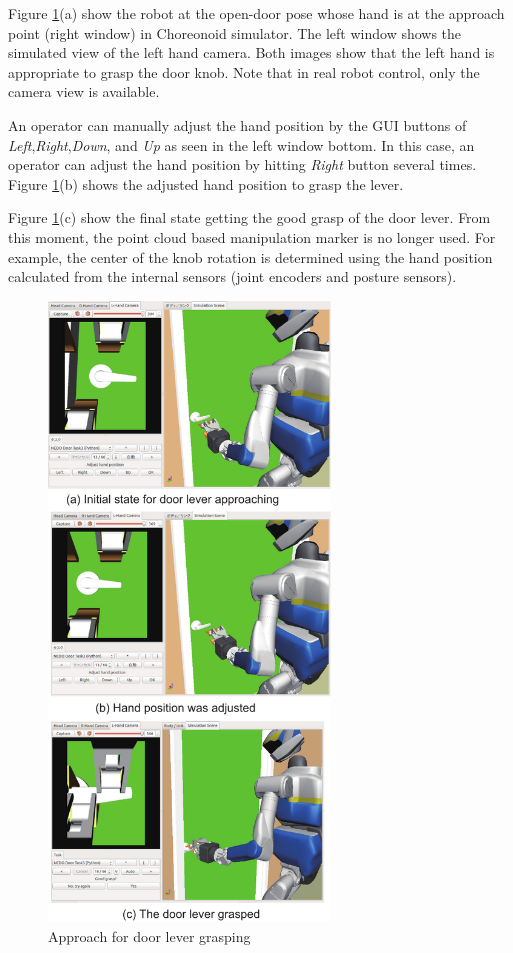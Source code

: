 Figure \ref{fig:door_lever_grasp}(a) show the robot at the open-door pose whose hand is at the approach point (right window) in Choreonoid simulator. The left window shows the simulated view of the left hand camera. Both images show that the left hand is appropriate to grasp the door knob. Note that in real robot control, only the camera view is available. 

 An operator can manually adjust the hand position by the GUI buttons of 
{\it Left},{\it Right},{\it Down}, and {\it Up} as seen in the left window bottom. In this case, an operator
can adjust the hand position by hitting {\it Right} button several times.
Figure \ref{fig:door_lever_grasp}(b) shows the adjusted hand position to grasp the lever.

Figure \ref{fig:door_lever_grasp}(c) show the final state getting the good grasp of the door lever. From this moment, the point cloud based manipulation marker is no longer used. For example, the center of the knob rotation is determined using the hand position calculated from the internal sensors (joint encoders and posture sensors). 
%
\begin{figure}[t]
  \centering
  \includegraphics[width = 7.5cm]{img/approach_door_lever}
  \caption{Approach for door lever grasping}
  \label{fig:door_lever_grasp}
\end{figure}


